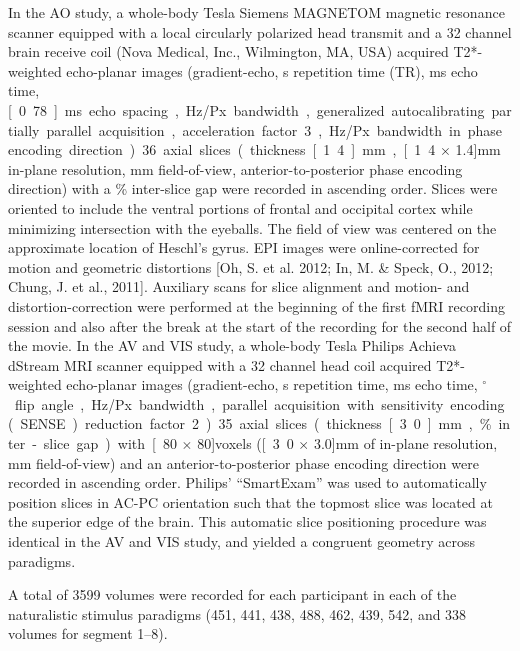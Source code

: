 \documentclass[english]{article}
\begin{document}
In the AO study, a whole-body \unit[7]{Tesla} Siemens MAGNETOM magnetic
resonance scanner equipped with a local circularly polarized head transmit and a
32 channel brain receive coil (Nova Medical, Inc., Wilmington, MA, USA) acquired
T2*-weighted echo-planar images (gradient-echo, \unit[2]{s} repetition time
(TR), \unit[22]{ms} echo time, \unit[0.78]{ms} echo spacing, \unit[1488]{Hz/Px}
bandwidth, generalized autocalibrating partially parallel acquisition,
acceleration factor 3, \unit[2]{Hz/Px} bandwidth in phase encoding direction).
36 axial slices (thickness \unit[1.4]{mm}, \unit[1.4 $\times$ 1.4]{mm} in-plane
resolution, \unit[224]{mm} field-of-view, anterior-to-posterior phase encoding
direction) with a \unit[10]{\%} inter-slice gap were recorded in ascending
order.  Slices were oriented to include the ventral portions of frontal and
occipital cortex while minimizing intersection with the eyeballs. The field of
view was centered on the approximate location of Heschl's gyrus.
EPI images were online-corrected for motion and geometric distortions [Oh, S. et
al. 2012; In, M. \& Speck, O., 2012; Chung, J. et al., 2011]. Auxiliary scans for slice alignment
and motion- and distortion-correction were performed at the beginning of the
first fMRI recording session and also after the break at the start of the
recording for the second half of the movie.
In the AV and VIS study, a whole-body \unit[3]{Tesla} Philips Achieva dStream
MRI scanner equipped with a 32 channel head coil acquired T2*-weighted
echo-planar images (gradient-echo, \unit[2]{s} repetition time, \unit[30]{ms}
echo time, \unit[90]{$^{\circ}$} flip angle, \unit[1943]{Hz/Px} bandwidth,
parallel acquisition with sensitivity encoding (SENSE) reduction factor 2).
35 axial slices (thickness \unit[3.0]{mm}, \unit[10]{\%} inter-slice gap) with
\unit[80 $\times$ 80]{voxels} (\unit[3.0 $\times$ 3.0]{mm} of in-plane
resolution, \unit[240]{mm} field-of-view) and an anterior-to-posterior phase
encoding direction were recorded in ascending order. Philips' ``SmartExam'' was
used to automatically position slices in AC-PC orientation such that the topmost
slice was located at the superior edge of the brain. This automatic slice
positioning procedure was identical in the AV and VIS study, and yielded a
congruent geometry across paradigms.

A total of 3599 volumes were recorded for each participant in each of the
naturalistic stimulus paradigms (451, 441, 438, 488, 462, 439, 542, and 338
volumes for segment 1–8).
\end{document}
